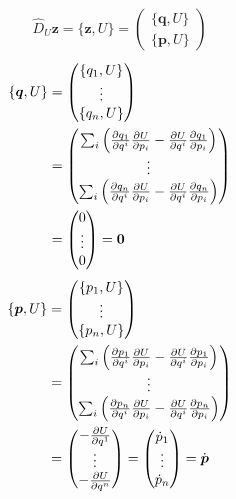 \documentclass{article}
\renewcommand{\vec}[1]{\boldsymbol{#1}}
\begin{document}
\begin{align*}
	\hat{D}_U \vec{z} = \{ \vec{z}, U \} =
	\begin{pmatrix}
		\{ \vec{q}, U \} \\
		\{ \vec{p}, U \}
	\end{pmatrix} 
\end{align*}
\begin{align*}
	\{ \vec{q}, U \} &= 
	\begin{pmatrix}
		\{ q_1, U \} \\
		\vdots \\
		\{ q_n, U \}
	\end{pmatrix} \\
	&=
	\begin{pmatrix}
		\sum_i \left( \pdv{q_1}{q^i} \pdv{U}{p_i} - \pdv{U}{q^i} \pdv{q_1}{p_i} \right) \\
		\vdots \\
		\sum_i \left( \pdv{q_n}{q^i} \pdv{U}{p_i} - \pdv{U}{q^i} \pdv{q_n}{p_i} \right)
	\end{pmatrix} \\
	&=
	\begin{pmatrix}
		0 \\
		\vdots \\
		0
	\end{pmatrix} = \vec{0}
\end{align*}
\begin{align*}
	\{ \vec{p}, U \} &= 
	\begin{pmatrix}
		\{ p_1, U \} \\
		\vdots \\
		\{ p_n, U \}
	\end{pmatrix} \\
	&=
	\begin{pmatrix}
		\sum_i \left( \pdv{p_1}{q^i} \pdv{U}{p_i} - \pdv{U}{q^i} \pdv{p_1}{p_i} \right) \\
		\vdots \\
		\sum_i \left( \pdv{p_n}{q^i} \pdv{U}{p_i} - \pdv{U}{q^i} \pdv{p_n}{p_i} \right)
	\end{pmatrix} \\
	&=
	\begin{pmatrix}
		-\pdv{U}{q^1} \\
		\vdots \\
		-\pdv{U}{q^n}
	\end{pmatrix} =
	\begin{pmatrix}
		\dot{p}_1 \\
		\vdots \\
		\dot{p}_n
	\end{pmatrix}
	= \dot{\vec{p}}
\end{align*}
\end{document}
